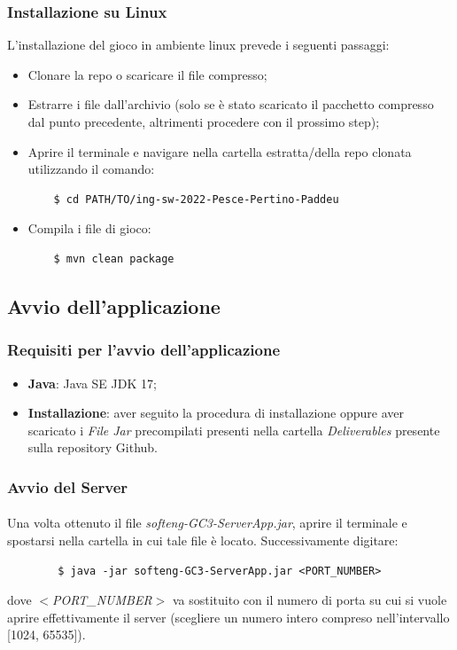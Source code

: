 \documentclass[a4paper, 12pt]{article}
\begin{document}
	\subsubsection{Installazione su Linux}
	L'installazione del gioco in ambiente linux prevede i seguenti passaggi:
	\begin{itemize}
		\item Clonare la repo o scaricare il file compresso;
		\item Estrarre i file dall'archivio (solo se è stato scaricato il pacchetto compresso dal punto precedente, altrimenti procedere con il prossimo step);
		\item Aprire il terminale e navigare nella cartella estratta/della repo clonata utilizzando il comando:
		\begin{verbatim}
	$ cd PATH/TO/ing-sw-2022-Pesce-Pertino-Paddeu
		\end{verbatim}
		\item Compila i file di gioco:
		\begin{verbatim}
	$ mvn clean package
		\end{verbatim}
	\end{itemize}
	
	\newpage
	\subsection{Avvio dell'applicazione}
	\subsubsection{Requisiti per l'avvio dell'applicazione}
	\begin{itemize}
		\item \textbf{Java}: Java SE JDK 17;
		\item \textbf{Installazione}: aver seguito la procedura di installazione oppure aver scaricato i \textit{File Jar} precompilati presenti nella cartella \textit{Deliverables} presente sulla repository Github.
	\end{itemize}
	\subsubsection{Avvio del Server}
	\paragraph{}
	Una volta ottenuto il file \textit{softeng-GC3-ServerApp.jar}, aprire il terminale e spostarsi nella cartella in cui tale file è locato.
	Successivamente digitare:
	\begin{verbatim}
		$ java -jar softeng-GC3-ServerApp.jar <PORT_NUMBER>
	\end{verbatim}
	dove $<$\textit{PORT\_NUMBER}$>$ va sostituito con il numero di porta su cui si vuole aprire effettivamente il server (scegliere un numero intero compreso nell'intervallo [1024, 65535]).
\end{document}
